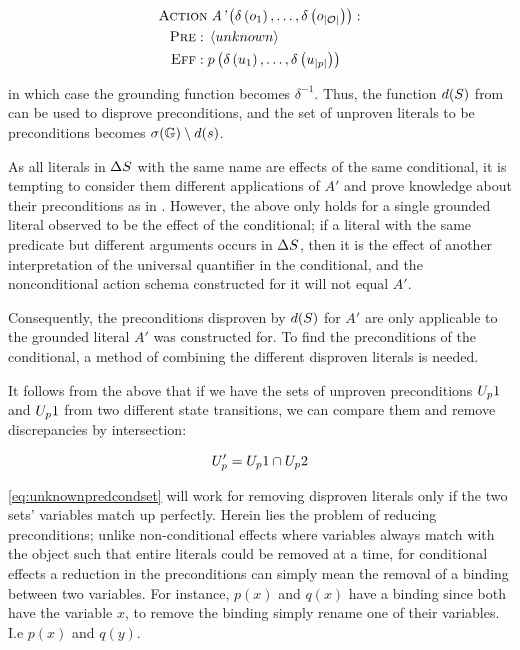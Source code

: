 \documentclass[\master/Master.tex]{subfiles}
\begin{document}
\begin{align*}
    \begin{split}
        \textsc{Action} &\; \textit{A'}\left(\delta \left( o_1 \right), \ldots, \delta \left( o_{|\mathcal{O}|}\right)\right): \\
        \textsc{Pre}: \; & \left< unknown \right> \\
        \textsc{Eff}: \; & p\left( \delta \left(u_1\right), \dots, \delta \left( u_{|p|} \right)\right)
    \end{split}
\end{align*}

in which case the grounding function becomes $\delta^{-1}$. Thus, the function $d(S)$ from  can be used to disprove preconditions, and the set of unproven literals to be preconditions becomes $\sigma(\mathbb{G}) \setminus d(s)$.

As all literals in $\Delta S$ with the same name are effects of the same conditional, it is tempting to consider them different applications of $A'$ and prove knowledge about their preconditions as in . However, the above only holds for a single grounded literal observed to be the effect of the conditional; if a literal with the same predicate but different arguments occurs in $\Delta S$, then it is the effect of another interpretation of the universal quantifier in the conditional, and the nonconditional action schema constructed for it will not equal $A'$.

Consequently, the preconditions disproven by $d(S)$ for $A'$ are only applicable to the grounded literal $A'$ was constructed for. To find the preconditions of the conditional, a method of combining the different disproven literals is needed.

It follows from the above that if we have the sets of unproven preconditions $U_p1$ and $U_p1$ from two different state transitions, we can compare them and remove discrepancies by intersection:

\begin{equation}
\label{eq:unknownpredcondset}
	U_p' = U_p1 \cap U_p2
\end{equation}

\eqref{eq:unknownpredcondset} will work for removing  disproven literals only if the two sets' variables match up perfectly. Herein lies the problem of reducing preconditions; unlike non-conditional effects where variables always match with the object such that entire literals could be removed at a time, for conditional effects a reduction in the preconditions can simply mean the removal of a binding between two variables. For instance, $p(x)$ and $q(x)$ have a binding since both have the variable $x$, to remove the binding simply rename one of their variables. I.e $p(x)$ and $q(y)$.
\end{document}

